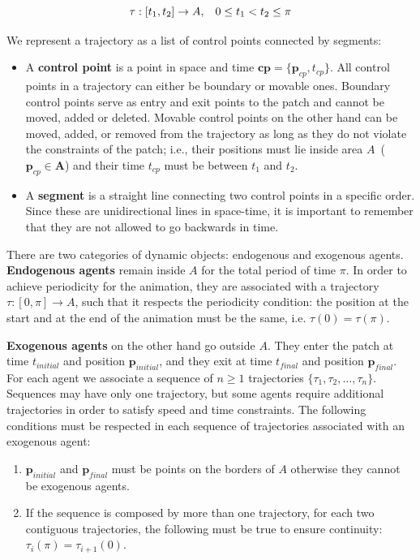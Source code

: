 \begin{equation}
	\tau:[t_1,t_2]\rightarrow A, \hspace{0.3cm} 0 \leq t_1 < t_2 \leq \pi
	\label{eqn:trajectory}
\end{equation}

We represent a trajectory as a list of control points connected by segments:

\begin{itemize}
  \item A {\bf control point} is a point in space and time $\mathbf{cp} = \{\mathbf{p}_{cp}, t_{cp}\}$.
All control points in a trajectory can either be boundary or movable ones.
Boundary control points serve as entry and exit points to the patch and cannot be moved, added or deleted.
Movable control points on the other hand can be moved, added, or removed from the trajectory as long as they do not violate the constraints of the patch; i.e., their positions must lie inside area $A$~($\mathbf{p}_{cp} \in \mathbf{A}$) and their time $t_{cp}$ must be between $t_1$ and $t_2$.
 \item A {\bf segment} is a straight line connecting two control points in a specific order. Since these are unidirectional lines in space-time, it is important to remember that they are not allowed to go backwards in time.  
\end{itemize}


There are two categories of dynamic objects: endogenous and exogenous agents.
{\bf Endogenous agents} remain inside $A$ for the total period of time $\pi$.
In order to achieve periodicity for the animation, they are associated with a trajectory $\tau : [0,\pi] \rightarrow A$, such that it respects the periodicity condition: the position at the start and at the end of the animation must be the same, i.e. \mbox{$\tau (0) = \tau (\pi)$}.

{\bf Exogenous agents} on the other hand go outside $A$.
They enter the patch at time $t_{initial}$ and position $\mathbf{p}_{initial}$, and they exit at time $t_{final}$ and position $\mathbf{p}_{final}$.
For each agent we associate a sequence of $n \ge 1$ trajectories $\{ \tau_1, \tau_2, \dots, \tau_n\}$.
Sequences may have only one trajectory, but some agents require additional trajectories in order to satisfy speed and time constraints.
The following conditions must be respected in each sequence of trajectories associated with an exogenous agent:

\begin{enumerate}
	\item $\mathbf{p}_{initial}$ and $\mathbf{p}_{final}$ must be points on the borders of $A$ otherwise they cannot be exogenous agents.
	\item If the sequence is composed by more than one trajectory, for each two contiguous trajectories, the following must be true to ensure continuity: $\tau_i(\pi) = \tau_{i+1}(0)$.

\end{enumerate}

